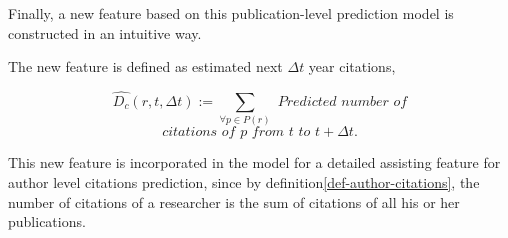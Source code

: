 Finally, a new feature based on this publication-level prediction model is constructed in an intuitive way.

\begin{definition}
The new feature is defined as estimated next $\Delta t$ year citations,

\[\hat{D_c}(r,t,\Delta t):=\sum_{\forall p \in P(r)} \textit{ Predicted number of}\]
\[\textit{citations of } p \textit{ from } t \textit{ to } t+\Delta t.\]
\end{definition}

This new feature is incorporated in the model for a detailed assisting feature for author level citations prediction, since by definition\ref{def-author-citations}, the number of citations of a researcher is the sum of citations of all his or her publications.
